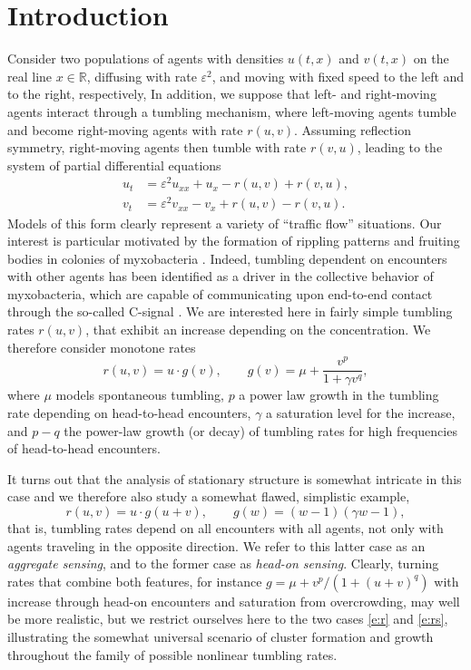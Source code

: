 \documentclass[10pt]{article}
\newcommand{\R}{\mathbb{R}}
\newcommand{\eps}{\varepsilon}
\begin{document}
 \section{Introduction}
Consider two populations of agents with densities $u(t,x)$ and $v(t,x)$ on the real line $x\in\R$, diffusing with rate $\eps^2$, and moving with fixed speed to the left and to the right, respectively, In addition, we suppose that left- and right-moving agents interact through a tumbling mechanism, where left-moving agents tumble and become right-moving agents with rate $r(u,v)$. Assuming reflection symmetry, right-moving agents then tumble with rate $r(v,u)$, leading to the system of partial differential equations
\begin{equation}\begin{aligned}
u_t &= \varepsilon^2 u_{xx} + u_x - r(u,v) + r(v,u),\\
v_t &= \varepsilon^2 v_{xx} - v_x + r(u,v) - r(v,u).
\label{myxo_pde}
\end{aligned}
\end{equation}
Models of this form clearly represent a variety of ``traffic flow'' situations. Our interest is particular motivated by the formation of rippling patterns and fruiting bodies in colonies of myxobacteria \cite{lutscher2002emerging,Reichenbach65,SagerKaiser94,scheel2016wavenumber,ShimketsKaiser82,WelchKaiser01}. Indeed, tumbling dependent on encounters with other agents has been identified as a driver in the collective behavior of myxobacteria, which are capable of communicating upon end-to-end contact through the so-called C-signal \cite{SagerKaiser94}. We are interested here in fairly simple tumbling rates $r(u,v)$, that exhibit an increase depending on the concentration. We therefore consider monotone rates 
\begin{equation}\label{e:r}
 r(u,v)=u\cdot g(v),\qquad g(v)= \mu + \frac{v^p}{1 + \gamma v^q},
\end{equation}
where $\mu$ models spontaneous tumbling, $p$ a power law growth in the tumbling rate depending on head-to-head encounters, $\gamma$ a saturation level for the increase, and $p-q$ the power-law growth (or decay) of tumbling rates for high frequencies of head-to-head encounters.

It turns out that the analysis of stationary structure is somewhat intricate in this case and we therefore also study a somewhat flawed, simplistic example,
\begin{equation} \label{e:rs}
 r(u,v)=u\cdot g(u+v),\qquad g(w)=(w-1)(\gamma w-1),
\end{equation}
that is, tumbling rates depend on all encounters with  all agents, not only with agents traveling in the opposite direction. We refer to this latter case as an \emph{aggregate sensing}, and to the former case as \emph{head-on sensing}. Clearly, turning rates that combine both features, for instance $g=\mu+v^p/(1+(u+v)^q)$ with increase through head-on encounters and saturation from overcrowding, may well be more realistic, but we restrict ourselves here to the two cases \eqref{e:r} and \eqref{e:rs}, illustrating the somewhat universal scenario of cluster formation and growth throughout the family of possible nonlinear tumbling rates. 
\end{document}
